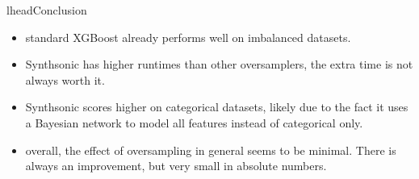 lhead{Conclusion}
    \begin{itemize}
        \item standard XGBoost already performs well on imbalanced datasets.
        \item Synthsonic has higher runtimes than other oversamplers, the extra time is not always worth it.
        \item Synthsonic scores higher on categorical datasets, likely due to the fact it uses a Bayesian network to model all features instead of categorical only.
        \item overall, the effect of oversampling in general seems to be minimal. There is always an improvement, but very small in absolute numbers.
    \end{itemize}